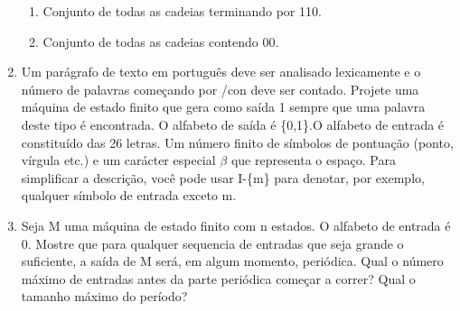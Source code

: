 \documentclass[a4paper,10pt]{article}
\begin{document}
\begin{enumerate}
\begin{enumerate}
	\item Conjunto de todas as cadeias terminando por 110.
	\item Conjunto de todas as cadeias contendo 00.
       \end{enumerate}
  \item Um parágrafo de texto em português deve ser analisado lexicamente e o número de palavras começando por \slash{con} deve ser contado. Projete uma máquina de estado 
	finito que gera como saída 1 sempre que uma palavra deste tipo é encontrada. O alfabeto de saída é \{0,1\}.O alfabeto de entrada é constituído das 26 letras. Um 
	número finito de símbolos de pontuação (ponto, vírgula etc.) e um carácter especial $\beta$ que representa o espaço. Para simplificar a descrição, você pode usar 
	I-\{m\} para denotar, por exemplo, qualquer símbolo de entrada exceto m.
  \item Seja M uma máquina de estado finito com n estados. O alfabeto de entrada é {0}. Mostre que para qualquer sequencia de entradas que seja grande o suficiente, a 
	saída de M será, em algum momento, periódica. Qual o número máximo de entradas antes da parte periódica começar a correr? Qual o tamanho máximo do período?
\end{enumerate}
\end{document}

